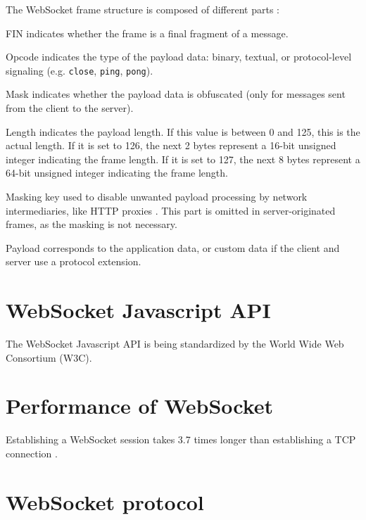 \documentclass[10pt,journal,compsoc]{IEEEtran}
\newcommand{\ttt}[1]{\texttt{#1}}
\newcommand{\ws}{WebSocket}
\begin{document}
The \ws{} frame structure is composed of different parts \cite{HighPerfBrowserNetworking:websocket} \cite{performanceEvaluationOfWebsocketProtocol} :
\begin{LaTeXdescription}    %
    \item[FIN] indicates whether the frame is a final fragment of a message.
    \item[Opcode] indicates the type of the payload data: binary, textual, or protocol-level signaling (e.g. \ttt{close}, \ttt{ping}, \ttt{pong}).
    \item[Mask] indicates whether the payload data is obfuscated (only for messages sent from the client to the server).
    \item[Length] indicates the payload length. If this value is between 0 and 125, this is the actual length.
                    If it is set to 126, the next 2 bytes represent a 16-bit unsigned integer indicating the frame length.
                    If it is set to 127, the next 8 bytes represent a 64-bit unsigned integer indicating the frame length.
    \item[Masking key] used to disable unwanted payload processing by network intermediaries, like HTTP proxies \cite{performanceEvaluationOfWebsocketProtocol}.
                    This part is omitted in server-originated frames, as the masking is not necessary.
    \item[Payload] corresponds to the application data, or custom data if the client and server use a protocol extension.
\end{LaTeXdescription}



\section{\ws{} Javascript API}
The \ws{} Javascript API is being standardized by the World Wide Web Consortium (W3C).


\section{Performance of WebSocket}

Establishing a \ws{} session takes 3.7 times longer than establishing a TCP connection \cite{performanceEvaluationOfWebsocketProtocol}.


\section{\ws{} protocol}
\end{document}
